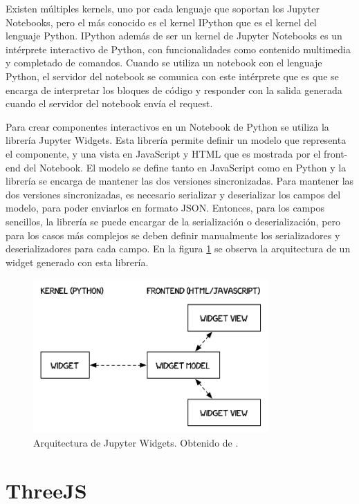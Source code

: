 Existen múltiples kernels, uno por cada lenguaje que soportan los Jupyter Notebooks, pero el más conocido es el kernel IPython que es el kernel del lenguaje Python. IPython además de ser un kernel de Jupyter Notebooks es un intérprete interactivo de Python, con funcionalidades como contenido multimedia y completado de comandos. Cuando se utiliza un notebook con el lenguaje Python, el servidor del notebook se comunica con este intérprete que es que se encarga de interpretar los bloques de código y responder con la salida generada cuando el servidor del notebook envía el request.

Para crear componentes interactivos en un Notebook de Python se utiliza la librería Jupyter Widgets. Esta librería permite definir un modelo que representa el componente, y una vista en JavaScript y HTML que es mostrada por el front-end del Notebook. El modelo se define tanto en JavaScript como en Python y la librería se encarga de mantener las dos versiones sincronizadas. Para mantener las dos versiones sincronizadas, es necesario serializar y deserializar los campos del modelo, para poder enviarlos en formato JSON. Entonces, para los campos sencillos, la librería se puede encargar de la serialización o deserialización, pero para los casos más complejos se deben definir manualmente los serializadores y deserializadores para cada campo. En la figura \ref{fig:widget_arq} se observa la arquitectura de un widget generado con esta librería.

\begin{figure}[h]
  \centering
  \includegraphics[width=0.8\textwidth]{imagenes/notebook/WidgetModelView}
  \caption{Arquitectura de Jupyter Widgets. Obtenido de \cite{arq-widget}.}
  \label{fig:widget_arq}
  \centering
\end{figure}

\section{ThreeJS}

